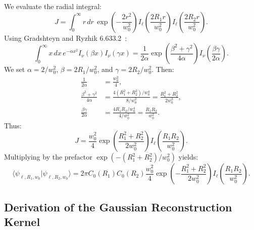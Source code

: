 \documentclass[11pt,a4paper]{article}
\begin{document}
We evaluate the radial integral:
\begin{equation}
J = \int_0^\infty r \, dr \, \exp\left( - \frac{2 r^2}{w_0^2} \right) I_\ell\left( \frac{2 R_1 r}{w_0^2} \right) I_\ell\left( \frac{2 R_2 r}{w_0^2} \right).
\label{eq:app_j_integral}
\end{equation}
Using Gradshteyn and Ryzhik 6.633.2~\cite{Gradshteyn2014}:
\begin{equation}
\int_0^\infty x \, dx \, e^{-\alpha x^2} I_\nu(\beta x) I_\nu(\gamma x) = \frac{1}{2\alpha} \exp\left( \frac{\beta^2 + \gamma^2}{4\alpha} \right) I_\nu\left( \frac{\beta \gamma}{2\alpha} \right).
\label{eq:app_weber_ref}
\end{equation}
We set $\alpha = 2 / w_0^2$, $\beta = 2 R_1 / w_0^2$, and $\gamma = 2 R_2 / w_0^2$. Then:
\begin{align}
\frac{1}{2\alpha} &= \frac{w_0^2}{4}, \\
\frac{\beta^2 + \gamma^2}{4\alpha} &= \frac{4(R_1^2 + R_2^2) / w_0^4}{8 / w_0^2} = \frac{R_1^2 + R_2^2}{2 w_0^2}, \\
\frac{\beta \gamma}{2\alpha} &= \frac{4 R_1 R_2 / w_0^4}{4 / w_0^2} = \frac{R_1 R_2}{w_0^2}.
\end{align}
Thus:
\begin{equation}
J = \frac{w_0^2}{4} \exp\left( \frac{R_1^2 + R_2^2}{2 w_0^2} \right) I_\ell\left( \frac{R_1 R_2}{w_0^2} \right).
\label{eq:app_j_result}
\end{equation}
Multiplying by the prefactor $\exp(-(R_1^2 + R_2^2)/w_0^2)$ yields:
\begin{equation}
\langle \psi_{\ell, R_1, w_0} | \psi_{\ell, R_2, w_0} \rangle = 2\pi C_0(R_1) C_0(R_2) \frac{w_0^2}{4} \exp\left( - \frac{R_1^2 + R_2^2}{2 w_0^2} \right) I_\ell\left( \frac{R_1 R_2}{w_0^2} \right).
\label{eq:app_exact_inner_prod}
\end{equation}

\subsection{Derivation of the Gaussian Reconstruction Kernel}
\end{document}
